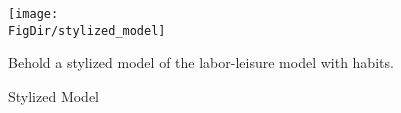 \begin{figure}[ht]
  \centerline{
    \texttt{[image: \\FigDir/stylized\_model]}
  }
  \caption{Stylized Model} \label{fig:stylized_model}
  \footnotesize{Behold a stylized model of the labor-leisure model with habits.}
\end{figure}



